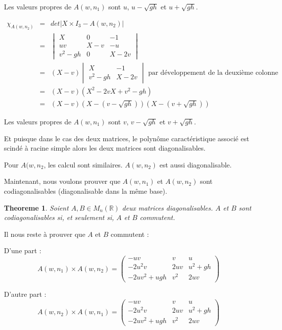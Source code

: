 \documentclass{article}
\newtheorem{thm}{Theoreme}
\begin{document}
Les valeurs propres de $A(w, n_1)$ sont $u$, $u-\sqrt{gh}$ et $u+\sqrt{gh}$.

\begin{eqnarray*}
	\chi_{A(w,n_2)} &=& det |X \times I_3 - A(w,n_2)| \\
	&=& \begin{vmatrix} X & 0 & -1 \\ uv & X-v & -u \\ v^2-gh & 0 & X-2v \end{vmatrix} \\
	&=& (X-v) \begin{vmatrix} X & -1 \\ v^2-gh & X-2v \end{vmatrix} \text{ par développement de la deuxième colonne} \\
	&=& (X-v) \left( X^2 - 2vX + v^2-gh \right) \\
	&=& (X-v) (X-(v-\sqrt{gh})) (X-(v+\sqrt{gh})) 
\end{eqnarray*}

Les valeurs propres de $A(w, n_1)$ sont $v$, $v-\sqrt{gh}$ et $v+\sqrt{gh}$.
\newline

Et puisque dans le cas des deux matrices, le polynôme caractéristique associé est scindé à racine simple alors les deux matrices sont diagonalisables.
\newline

Pour $A(w,n_2$, les calcul sont similaires. $A(w, n_2)$ est aussi diagonalisable.

Maintenant, nous voulons prouver que $A(w,n_1)$ et $A(w,n_2)$ sont codiagonalisables (diagonalisable dans la même base).

\begin{thm}
	Soient $A,B \in M_n(\mathbb{R})$ deux matrices diagonalisables. $A$ et $B$ sont codiagonalisables si, et seulement si, $A$ et $B$ commutent.
\end{thm}

Il nous reste à prouver que $A$ et $B$ commutent :

D'une part :
\[ A(w,n_1) \times A(w,n_2) = \begin{pmatrix} -uv & v & u \\ -2u^2v & 2uv & u^2+gh \\ -2uv^2+ugh & v^2 & 2uv \end{pmatrix} \]

D'autre part :
\[ A(w,n_2) \times A(w,n_1) = \begin{pmatrix} -uv & v & u \\ -2u^2v & 2uv & u^2+gh \\ -2uv^2+ugh & v^2 & 2uv \end{pmatrix}   \]
\end{document}

